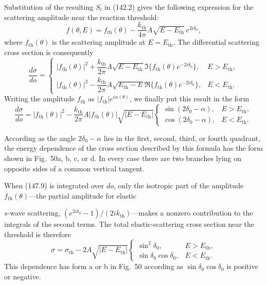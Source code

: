 Substitution of the resulting $S_l$ in (142.2) gives the following expression for the scattering amplitude near the reaction threshold:
\begin{equation}
 f(\theta,E)=f_{\mathrm{th}}(\theta)-\frac{k_{\mathrm{th}}}{4\pi}A
 \sqrt{E-E_{\mathrm{th}}}\,e^{2i\delta_0},
 \tag{147.8}
\end{equation}
where $f_{\mathrm{th}}(\theta)$ is the scattering amplitude at $E=E_{\mathrm{th}}$. The differential scattering cross section is consequently
\[
 \frac{d\sigma}{d\mathit{o}}=
 \begin{cases}
 |f_{\mathrm{th}}(\theta)|^2+\dfrac{k_{\mathrm{th}}}{2\pi}A\sqrt{E-E_{\mathrm{th}}}
 \Im\{f_{\mathrm{th}}(\theta)e^{-2i\delta_0}\},&E>E_{\mathrm{th}},\\
 |f_{\mathrm{th}}(\theta)|^2-\dfrac{k_{\mathrm{th}}}{2\pi}A\sqrt{E_{\mathrm{th}}-E}
 \Re\{f_{\mathrm{th}}(\theta)e^{-2i\delta_0}\},&E<E_{\mathrm{th}}.
 \end{cases}
\]
Writing the amplitude $f_{\mathrm{th}}$ as $|f_{\mathrm{th}}|e^{i\alpha(\theta)}$, we finally put this result in the form
\begin{equation}
 \frac{d\sigma}{d\mathit{o}}=|f_{\mathrm{th}}(\theta)|^2-
 \frac{k_{\mathrm{th}}}{2\pi}A|f_{\mathrm{th}}(\theta)|\sqrt{|E-E_{\mathrm{th}}|}
 \begin{cases}
 \sin(2\delta_0-\alpha),&E>E_{\mathrm{th}},\\
 \cos(2\delta_0-\alpha),&E<E_{\mathrm{th}}.
 \end{cases}
 \tag{147.9}
\end{equation}

According as the angle $2\delta_0-\alpha$ lies in the first, second, third, or fourth quadrant, the energy dependence of the cross section described by this formula has the form shown in Fig.~50a, b, c, or d. In every case there are two branches lying on opposite sides of a common vertical tangent.

When (147.9) is integrated over $d\mathit{o}$, only the isotropic part of the amplitude $f_{\mathrm{th}}(\theta)$---the partial amplitude for elastic

$s$-wave scattering, $(e^{2i\delta_0}-1)/(2ik_{\mathrm{th}})$---makes a nonzero contribution to the integrals of the second terms. The total elastic-scattering cross section near the threshold is therefore
\begin{equation}
 \sigma=\sigma_{\mathrm{th}}-2A\sqrt{|E-E_{\mathrm{th}}|}
 \begin{cases}
 \sin^2\delta_0,&E>E_{\mathrm{th}},\\
 \sin\delta_0\cos\delta_0,&E<E_{\mathrm{th}}.
 \end{cases}
 \tag{147.10}
\end{equation}
This dependence has form a or b in Fig.~50 according as $\sin\delta_0\cos\delta_0$ is positive or negative.

